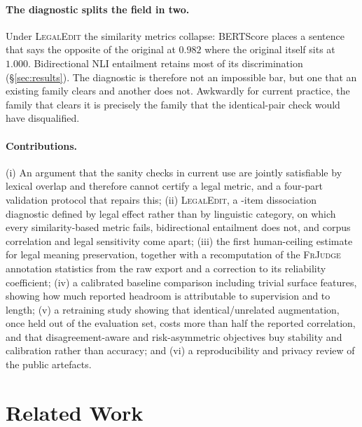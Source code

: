 \documentclass[11pt]{article}
\begin{document}
\paragraph{The diagnostic splits the field in two.}
Under \textsc{LegalEdit} the similarity metrics collapse: BERTScore places a
sentence that says the opposite of the original at $0.982$ where the original
itself sits at $1.000$. Bidirectional NLI entailment retains most of its
discrimination (\S\ref{sec:results}). The diagnostic is therefore not an
impossible bar, but one that an existing family clears and another does not.
Awkwardly for current practice, the family that clears it is precisely the
family that the identical-pair check would have disqualified.

\paragraph{Contributions.}
(i) An argument that the sanity checks in current use are jointly satisfiable by
lexical overlap and therefore cannot certify a legal metric, and a four-part
validation protocol that repairs this; (ii) \textsc{LegalEdit}, a \numedits-item
dissociation diagnostic defined by legal effect rather than by linguistic
category, on which every similarity-based metric fails, bidirectional entailment
does not, and corpus correlation and legal sensitivity come apart; (iii) the
first human-ceiling estimate for legal meaning preservation, together with a
recomputation of the \textsc{FrJudge} annotation statistics from the raw export
and a correction to its reliability coefficient; (iv) a calibrated baseline
comparison including trivial surface features, showing how much reported
headroom is attributable to supervision and to length; (v) a retraining study
showing that identical/unrelated augmentation, once held out of the evaluation
set, costs more than half the reported correlation, and that disagreement-aware
and risk-asymmetric objectives buy stability and calibration rather than
accuracy; and (vi) a reproducibility and privacy review of the public artefacts.

\section{Related Work}
\label{sec:related}
\end{document}
